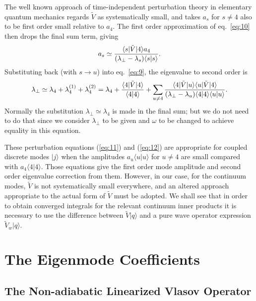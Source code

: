 \documentclass[12pt]{article}
\def\ket#1{|#1\rangle}
\def\bra#1{\langle#1}
\begin{document}
The well known approach of time-independent perturbation theory in
elementary quantum mechanics\cite[see e.g.][Section 43]{Dirac1958}
regards $\tilde{V}$ as systematically small, and takes $a_s$ for
$s\not=4$ also to be first order small relative to $a_4$. The first
order approximation of eq.\ \ref{eq:10} then drops the final sum term,
giving
\begin{equation}
  \label{eq:11}
  a_s \simeq {\bra{s}|\tilde{V}\ket{4}a_4\over (\lambda_\perp-\lambda_s)\bra{s}\ket{s}}.
\end{equation}
Substituting back (with $s\to u$) into eq.\ \ref{eq:9}, the
eigenvalue to second order is
\begin{equation}
  \label{eq:12}
 \lambda_\perp\simeq \lambda_4+\lambda_{4}^{(1)}+\lambda_{4}^{(2)}=\lambda_4
  +{\bra{4}|\tilde{V}\ket{4}\over \bra{4}\ket{4}}
    +\sum_{u\not=4}
    {\bra{4}|\tilde{V}\ket{u}\bra{u}|\tilde{V}\ket{4}\over
      (\lambda_\perp-\lambda_u)\bra{4}\ket{4}\bra{u}\ket{u}}.
\end{equation}
Normally the substitution $\lambda_\perp\simeq\lambda_4$ is made in
the final sum; but we do not need to do that since we consider
$\lambda_\perp$ to be given and $\omega$ to be changed to achieve
equality in this equation.

These perturbation equations (\ref{eq:11}) and (\ref{eq:12}) are
appropriate for coupled discrete modes $\ket{j}$ when the amplitudes
$a_u\bra{u}\ket{u}$ for $u\not=4$ are small compared with
$a_4\bra{4}\ket{4}$. Those equations give the first order mode
amplitude and second order eigenvalue correction from them.  However,
in our case, for the continuum modes, $\tilde{V}$ is not
systematically small everywhere, and an altered approach appropriate
to the actual form of $\tilde{V}$ must be adopted. We shall see that
in order to obtain converged integrals for the relevant continuum
inner products it is necessary to use the difference between
$\tilde V \ket{q}$ and a pure wave operator expression
$\tilde V_w\ket{q}$.


\section{The Eigenmode Coefficients}
\subsection{The Non-adiabatic Linearized Vlasov Operator}
\end{document}
